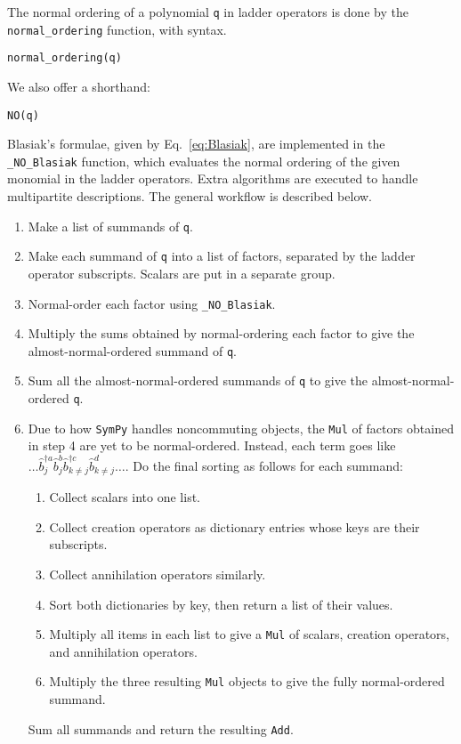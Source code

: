 \documentclass[5p, twocolumn, 10pt, sort&compress]{elsarticle}
\newcommand{\inlinecode}[1]{\texttt{#1}}
\newcommand{\bop}{\hat{b}}
\newcommand{\bdagn}[1]{\bop^{\dagger {#1}}}
\begin{document}
The normal ordering of a polynomial \inlinecode{q} in ladder operators is done by the \inlinecode{normal_ordering} function, with syntax.
\begin{verbatim}
normal_ordering(q)
\end{verbatim}
We also offer a shorthand:
\begin{verbatim}
NO(q)
\end{verbatim}
Blasiak's formulae, given by Eq.~\eqref{eq:Blasiak}, are implemented in the \inlinecode{_NO_Blasiak} function, which evaluates the normal ordering of the given monomial in the ladder operators.  Extra algorithms are executed to handle multipartite descriptions.  The general workflow is described below.
\begin{enumerate}
    \item Make a list of summands of \inlinecode{q}.
    
    \item Make each summand of \inlinecode{q} into a list of factors, separated by the ladder operator subscripts. Scalars are put in a separate group.
    
    \item Normal-order each factor using \inlinecode{_NO_Blasiak}.
    
    \item Multiply the sums obtained by normal-ordering each factor to give the almost-normal-ordered summand of \inlinecode{q}. 
    
    \item Sum all the almost-normal-ordered summands of \inlinecode{q} to give the almost-normal-ordered \inlinecode{q}.
    
    \item Due to how \texttt{SymPy} handles noncommuting objects, the \inlinecode{Mul} of factors obtained in step 4 are yet to be normal-ordered. Instead, each term goes like $\dots \bdagn{a}_j\bop^b_j\bdagn{c}_{k\neq j}\bop^{d}_{k\neq j}\dots$. Do the final sorting as follows for each summand:
    \begin{enumerate}
        \item Collect scalars into one list.
        \item Collect creation operators as dictionary entries whose keys are their subscripts.
        \item Collect annihilation operators similarly.
        \item Sort both dictionaries by key, then return a list of their values. 
        \item Multiply all items in each list to give a \inlinecode{Mul} of scalars, creation operators, and annihilation operators.
        \item Multiply the three resulting \inlinecode{Mul} objects to give the fully normal-ordered summand.
    \end{enumerate}
    Sum all summands and return the resulting \inlinecode{Add}. 
\end{enumerate}
\end{document}
